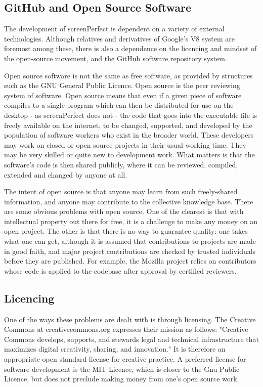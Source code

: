 \subsection{GitHub and Open Source Software}
The development of screenPerfect is dependent on a variety of external technologies. Although relatives and derivatives of Google's V8 system are foremost among these, there is also a dependence on the licencing and mindset of the open-source movement, and the GitHub software repository system.

Open source software is not the same as free software, as provided by structures such as the GNU General Public Licence. Open source is the peer reviewing system of software. Open source means that even if a given piece of software compiles to a single program which can then be distributed for use on the desktop - as screenPerfect does not - the code that goes into the executable file is freely available on the internet, to be changed, supported, and developed by the population of software workers who exist in the broader world. These developers may work on closed or open source projects in their usual working time. They may be very skilled or quite new to development work. What matters is that the software's code is then shared publicly, where it can be reviewed, compiled, extended and changed by anyone at all.

The intent of open source is that anyone may learn from such freely-shared information, and anyone may contribute to the collective knowledge base. There are some obvious problems with open source. One of the clearest is that with intellectual property out there for free, it is a challenge to make any money on an open project. The other is that there is no way to guarantee quality: one takes what one can get, although it is assumed that contributions to projects are made in good faith, and major project contributions are checked by trusted individuals before they are published. For example, the Mozilla project relies on contributors whose code is applied to the codebase after approval by certified reviewers.

\subsection{Licencing}
One of the ways these problems are dealt with is through licensing. The Creative Commons at creativecommons.org expresses their mission as follows: "Creative Commons develops, supports, and stewards legal and technical infrastructure that maximizes digital creativity, sharing, and innovation." It is therefore an appropriate open standard license for creative practice. A preferred license for software development is the MIT Licence, which is closer to the Gnu Public Licence, but does not preclude making money from one's open source work. 

